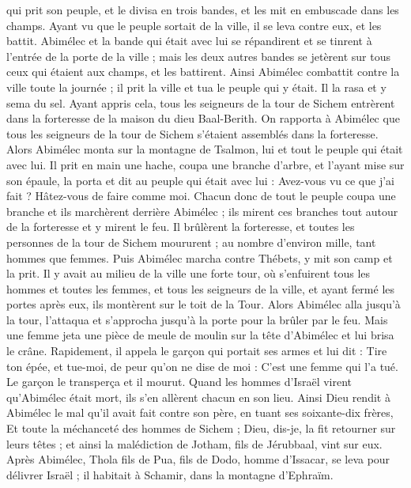 \begin{multicols}{2}
qui prit son peuple, et le divisa en trois bandes, et les mit en embuscade dans les champs. Ayant vu que le peuple sortait de la ville, il se leva contre eux, et les battit.
Abimélec et la bande qui était avec lui se répandirent et se tinrent à l'entrée de la porte de la ville ; mais les deux autres bandes se jetèrent sur tous ceux qui étaient aux champs, et les battirent.
Ainsi Abimélec combattit contre la ville toute la journée ; il prit la ville et tua le peuple qui y était. Il la rasa et y sema du sel.
Ayant appris cela, tous les seigneurs de la tour de Sichem entrèrent dans la forteresse de la maison du dieu Baal-Berith.
On rapporta à Abimélec que tous les seigneurs de la tour de Sichem s'étaient assemblés dans la forteresse.
Alors Abimélec monta sur la montagne de Tsalmon, lui et tout le peuple qui était avec lui. Il prit en main une hache, coupa une branche d'arbre, et l'ayant mise sur son épaule, la porta et dit au peuple qui était avec lui : Avez-vous vu ce que j'ai fait ? Hâtez-vous de faire comme moi.
Chacun donc de tout le peuple coupa une branche et ils marchèrent derrière Abimélec ; ils mirent ces branches tout autour de la forteresse et y mirent le feu. Il brûlèrent la forteresse, et toutes les personnes de la tour de Sichem moururent ; au nombre d'environ mille, tant hommes que femmes.
Puis Abimélec marcha contre Thébets, y mit son camp et la prit.
Il y avait au milieu de la ville une forte tour, où s'enfuirent tous les hommes et toutes les femmes, et tous les seigneurs de la ville, et ayant fermé les portes après eux, ils montèrent sur le toit de la Tour.
Alors Abimélec alla jusqu'à la tour, l'attaqua et s'approcha jusqu'à la porte pour la brûler par le feu.
Mais une femme jeta une pièce de meule de moulin sur la tête d'Abimélec et lui brisa le crâne.
Rapidement, il appela le garçon qui portait ses armes et lui dit : Tire ton épée, et tue-moi, de peur qu'on ne dise de moi : C'est une femme qui l'a tué. Le garçon le transperça et il mourut.
Quand les hommes d'Israël virent qu'Abimélec était mort, ils s'en allèrent chacun en son lieu.
Ainsi Dieu rendit à Abimélec le mal qu'il avait fait contre son père, en tuant ses soixante-dix frères,
Et toute la méchanceté des hommes de Sichem ; Dieu, dis-je, la fit retourner sur leurs têtes ; et ainsi la malédiction de Jotham, fils de Jérubbaal, vint sur eux.
\VerseOne{}Après Abimélec, Thola fils de Pua, fils de Dodo, homme d'Issacar, se leva pour délivrer Israël ; il habitait à Schamir, dans la montagne d'Ephraïm.

\end{multicols}
